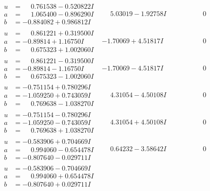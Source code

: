 \documentclass[1p]{elsarticle_modified}
\theoremstyle{definition}
\begin{document}
$$\begin{array}{c|c|c}
\begin{aligned}
u &= \phantom{-}0.761538 - 0.520822 I \\
a &= \phantom{-}1.065400 - 0.896290 I \\
b &= -0.884082 + 0.986812 I\end{aligned}
 & \phantom{-}5.03019 - 1.92758 I & \phantom{-0.000000 } 0 \\ \hline\begin{aligned}
u &= \phantom{-}0.861221 + 0.319500 I \\
a &= -0.89814 + 1.16750 I \\
b &= \phantom{-}0.675323 + 1.002060 I\end{aligned}
 & -1.70069 + 4.51817 I & \phantom{-0.000000 } 0 \\ \hline\begin{aligned}
u &= \phantom{-}0.861221 - 0.319500 I \\
a &= -0.89814 - 1.16750 I \\
b &= \phantom{-}0.675323 - 1.002060 I\end{aligned}
 & -1.70069 - 4.51817 I & \phantom{-0.000000 } 0 \\ \hline\begin{aligned}
u &= -0.751154 + 0.780296 I \\
a &= -1.059250 + 0.743059 I \\
b &= \phantom{-}0.769638 - 1.038270 I\end{aligned}
 & \phantom{-}4.31054 - 4.50108 I & \phantom{-0.000000 } 0 \\ \hline\begin{aligned}
u &= -0.751154 - 0.780296 I \\
a &= -1.059250 - 0.743059 I \\
b &= \phantom{-}0.769638 + 1.038270 I\end{aligned}
 & \phantom{-}4.31054 + 4.50108 I & \phantom{-0.000000 } 0 \\ \hline\begin{aligned}
u &= -0.583906 + 0.704669 I \\
a &= \phantom{-}0.994060 - 0.654478 I \\
b &= -0.807640 - 0.029711 I\end{aligned}
 & \phantom{-}0.64232 - 3.58642 I & \phantom{-0.000000 } 0 \\ \hline\begin{aligned}
u &= -0.583906 - 0.704669 I \\
a &= \phantom{-}0.994060 + 0.654478 I \\
b &= -0.807640 + 0.029711 I\end{aligned}

\end{array}$$
\end{document}
